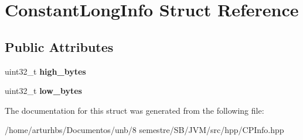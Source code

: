 \hypertarget{structConstantLongInfo}{}\section{Constant\+Long\+Info Struct Reference}
\label{structConstantLongInfo}
\subsection*{Public Attributes}
\begin{DoxyCompactItemize}
\item 
uint32\+\_\+t {\bfseries high\+\_\+bytes}\hypertarget{structConstantLongInfo_acc5f4a27a7ebbeb036c095934ba2c661}{}\label{structConstantLongInfo_acc5f4a27a7ebbeb036c095934ba2c661}

\item 
uint32\+\_\+t {\bfseries low\+\_\+bytes}\hypertarget{structConstantLongInfo_afad1110f24748eaec3b0210c7cf014c3}{}\label{structConstantLongInfo_afad1110f24748eaec3b0210c7cf014c3}

\end{DoxyCompactItemize}


The documentation for this struct was generated from the following file\+:\begin{DoxyCompactItemize}
\item 
/home/arturhbs/\+Documentos/unb/8 semestre/\+S\+B/\+J\+V\+M/src/hpp/C\+P\+Info.\+hpp\end{DoxyCompactItemize}
